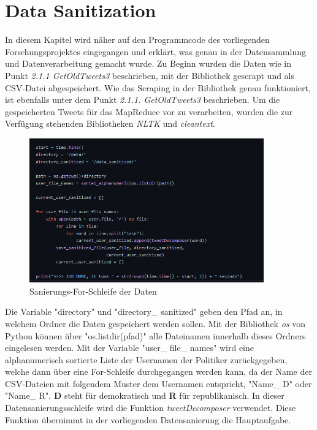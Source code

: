 \section{Data Sanitization}
	
In diesem Kapitel wird näher auf den Programmcode des vorliegenden Forschungsprojektes eingegangen und erklärt, was genau in der Datensammlung und Datenverarbeitung gemacht wurde. Zu Beginn wurden die Daten wie in Punkt \textit{2.1.1 GetOldTweets3} beschrieben, mit der Bibliothek gescrapt und als CSV-Datei abgespeichert. Wie das Scraping in der Bibliothek genau funktioniert, ist ebenfalls unter dem Punkt \textit{2.1.1. GetOldTweets3} beschrieben. Um die gespeicherten Tweets für das MapReduce vor zu verarbeiten, wurden die zur Verfügung stehenden Bibliotheken \textit{NLTK} und \textit{cleantext}.
	
	
	\begin{figure}[ht]
		\centering
		\includegraphics[width=0.9\textwidth]{images/Kapitel2/Code_Datensanierung_1}
		\caption{\label{fig:DataSan}Sanierungs-For-Schleife der Daten}
	\end{figure}
	
Die Variable "directory" und "directory\_ sanitized" geben den Pfad an, in welchem Ordner die Daten gespeichert werden sollen. Mit der Bibliothek \textit{os} von Python können über "os.listdir(pfad)" alle Dateinamen innerhalb dieses Ordners eingelesen werden. Mit der Variable "user\_ file\_ names" wird eine alphanumerisch sortierte Liste der Usernamen der Politiker zurückgegeben, welche dann über eine For-Schleife durchgegangen werden kann, da der Name der CSV-Dateien mit folgendem Muster dem Usernamen entspricht, "Name\_ D" oder "Name\_ R". \textbf{D} steht für demokratisch und \textbf{R} für republikanisch. In dieser Datensanierungsschleife wird die Funktion \textit{tweetDecomposer} verwendet. Diese Funktion übernimmt in der vorliegenden Datensanierung die Hauptaufgabe.
	
